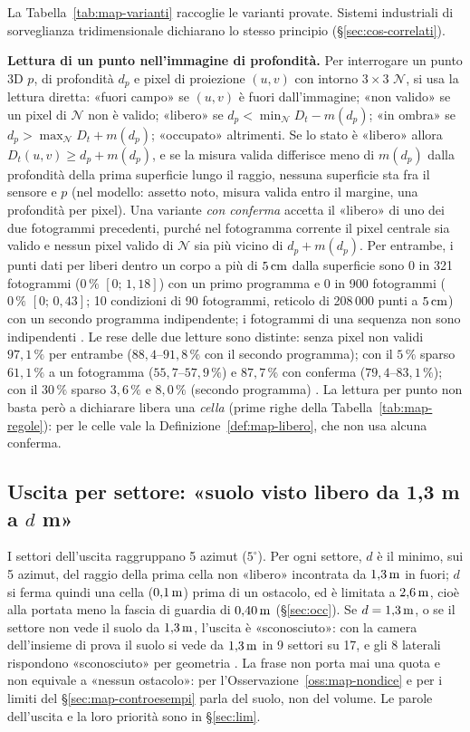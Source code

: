 La Tabella~\ref{tab:map-varianti} raccoglie le varianti provate. Sistemi industriali di sorveglianza tridimensionale dichiarano lo stesso principio (\S\ref{sec:cos-correlati}).

\textbf{Lettura di un punto nell'immagine di profondità.} Per interrogare un punto 3D $p$, di profondità $d_p$ e pixel di proiezione $(u,v)$ con intorno $3\times3$ $\mathcal N$, si usa la lettura diretta: «fuori campo» se $(u,v)$ è fuori dall'immagine; «non valido» se un pixel di $\mathcal N$ non è valido; «libero» se $d_p<\min_{\mathcal N}D_t-m(d_p)$; «in ombra» se $d_p>\max_{\mathcal N}D_t+m(d_p)$; «occupato» altrimenti. Se lo stato è «libero» allora $D_t(u,v)\ge d_p+m(d_p)$, e se la misura valida differisce meno di $m(d_p)$ dalla profondità della prima superficie lungo il raggio, nessuna superficie sta fra il sensore e $p$  (nel modello: assetto noto, misura valida entro il margine, una profondità per pixel). Una variante \emph{con conferma} accetta il «libero» di uno dei due fotogrammi precedenti, purché nel fotogramma corrente il pixel centrale sia valido e nessun pixel valido di $\mathcal N$ sia più vicino di $d_p+m(d_p)$. Per entrambe, i punti dati per liberi dentro un corpo a più di $5\,\mathrm{cm}$ dalla superficie sono 0 in 321 fotogrammi ($0\,\%$ $[0;\,1{,}18]$) con un primo programma e 0 in 900 fotogrammi ($0\,\%$ $[0;\,0{,}43]$; 10 condizioni di 90 fotogrammi, reticolo di 208\,000 punti a $5\,\mathrm{cm}$) con un secondo programma indipendente; i fotogrammi di una sequenza non sono indipendenti . Le rese delle due letture sono distinte: senza pixel non validi $97{,}1\,\%$ per entrambe ($88{,}4$–$91{,}8\,\%$ con il secondo programma); con il $5\,\%$ sparso $61{,}1\,\%$ a un fotogramma ($55{,}7$–$57{,}9\,\%$) e $87{,}7\,\%$ con conferma ($79{,}4$–$83{,}1\,\%$); con il $30\,\%$ sparso $3{,}6\,\%$ e $8{,}0\,\%$ (secondo programma) . La lettura per punto non basta però a dichiarare libera una \emph{cella} (prime righe della Tabella~\ref{tab:map-regole}): per le celle vale la Definizione~\ref{def:map-libero}, che non usa alcuna conferma.

\subsection{Uscita per settore: «suolo visto libero da 1,3 m a $d$ m»}\label{sec:map-uscita}

I settori dell'uscita raggruppano 5 azimut ($5^\circ$). Per ogni settore, $d$ è il minimo, sui 5 azimut, del raggio della prima cella non «libero» incontrata da $1{,}3\,\mathrm{m}$ in fuori; $d$ si ferma quindi una cella ($0{,}1\,\mathrm{m}$) prima di un ostacolo, ed è limitata a $2{,}6\,\mathrm{m}$, cioè alla portata meno la fascia di guardia di $0{,}40\,\mathrm{m}$ (\S\ref{sec:occ}). Se $d=1{,}3\,\mathrm{m}$, o se il settore non vede il suolo da $1{,}3\,\mathrm{m}$, l'uscita è «sconosciuto»: con la camera dell'insieme di prova il suolo si vede da $1{,}3\,\mathrm{m}$ in 9 settori su 17, e gli 8 laterali rispondono «sconosciuto» per geometria . La frase non porta mai una quota e non equivale a «nessun ostacolo»: per l'Osservazione~\ref{oss:map-nondice} e per i limiti del \S\ref{sec:map-controesempi} parla del suolo, non del volume. Le parole dell'uscita e la loro priorità sono in \S\ref{sec:lim}.

